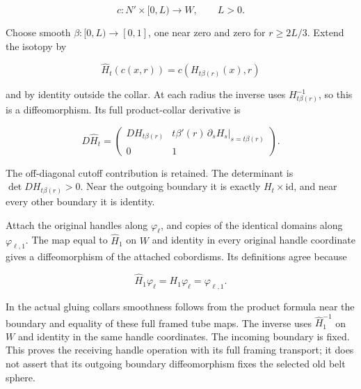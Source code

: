 \begin{equation}
c:N'\times[0,L)\longrightarrow W,\qquad L>0.
\label{courseIII:whitney-move-with-controlled-support:eq:6.6}
\end{equation}

Choose smooth \(\beta:[0,L)\to[0,1]\), one near zero and zero for \(r\geq2L/3\). Extend the isotopy by

\begin{equation}
\widehat H_t(c(x,r))=c(H_{t\beta(r)}(x),r)
\label{courseIII:whitney-move-with-controlled-support:eq:6.7}
\end{equation}

and by identity outside the collar. At each radius the inverse uses \(H_{t\beta(r)}^{-1}\), so this is a diffeomorphism. Its full product-collar derivative is

\begin{equation}
D\widehat H_t=
\begin{pmatrix}
DH_{t\beta(r)}&
t\beta'(r)\,\partial_sH_s|_{s=t\beta(r)}\\
0&1
\end{pmatrix}.
\label{courseIII:whitney-move-with-controlled-support:eq:6.8}
\end{equation}

The off-diagonal cutoff contribution is retained. The determinant is \(\det DH_{t\beta(r)}>0\). Near the outgoing boundary it is exactly \(H_t\times\mathrm{id}\), and near every other boundary it is identity.

Attach the original handles along \(\varphi_\ell\), and copies of the identical domains along \(\varphi_{\ell,1}\). The map equal to \(\widehat H_1\) on \(W\) and identity in every original handle coordinate gives a diffeomorphism of the attached cobordisms. Its definitions agree because

\begin{equation}
\widehat H_1\varphi_\ell=H_1\varphi_\ell=\varphi_{\ell,1}.
\label{courseIII:whitney-move-with-controlled-support:eq:6.9}
\end{equation}

In the actual gluing collars smoothness follows from the product formula near the boundary and equality of these full framed tube maps. The inverse uses \(\widehat H_1^{-1}\) on \(W\) and identity in the same handle coordinates. The incoming boundary is fixed. This proves the receiving handle operation with its full framing transport; it does not assert that its outgoing boundary diffeomorphism fixes the selected old belt sphere.

